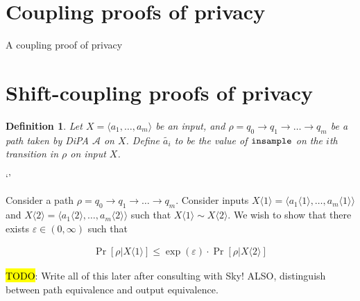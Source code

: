\documentclass{article}
\newtheorem{definition}{Definition}[section]
\renewcommand{\epsilon}{\varepsilon}
\newcommand{\insample}{\textup{\texttt{insample}}}
\newcommand{\1}{\langle 1 \rangle}
\newcommand{\2}{\langle 2 \rangle}
\begin{document}
\section{Coupling proofs of privacy}

A coupling proof of privacy 

\section{Shift-coupling proofs of privacy}

\begin{definition}
    Let  $X = \langle a_1, \dots, a_m \rangle$ be an input, and $\rho = q_0 \to q_1 \to \dots \to q_m$ be a path taken by DiPA $\mathcal{A}$ on $X$. Define $\tilde{a_i}$ to be the value of $\insample$ on the $i$th transition in $\rho$ on input $X$.
\end{definition}`'

Consider a path $\rho = q_0 \to q_1 \to \dots \to q_m$. Consider inputs $X \langle 1 \rangle = \langle a_1 \langle 1 \rangle, \dots, a_m \langle 1 \rangle \rangle$ and $X \langle 2 \rangle = \langle a_1 \langle 2 \rangle, \dots, a_m \langle 2 \rangle \rangle$ such that $X \langle 1 \rangle \sim X \langle 2 \rangle$. We wish to show that there exists $\epsilon \in (0, \infty)$ such that

\begin{align*}
    \Pr\left[\rho | X \langle 1 \rangle \right] \leq \exp(\epsilon) \cdot \Pr\left[\rho | X \langle 2 \rangle\right]
\end{align*}

\hl{TODO}: Write all of this later after consulting with Sky! ALSO, distinguish between path equivalence and output equivalence.
\end{document}

